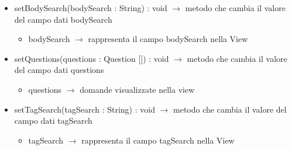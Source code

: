 \begin{description}
\begin{itemize}
	\item setBodySearch(bodySearch : String) : void $\rightarrow$ metodo che cambia il valore del campo dati bodySearch\begin{itemize}
		\item bodySearch $\rightarrow$ rappresenta il campo bodySearch nella View
	\end{itemize}
	
	\item setQuestions(questions : Question []) : void $\rightarrow$ metodo che cambia il valore del campo dati questions\begin{itemize}
		\item questions $\rightarrow$ domande visualizzate nella view
	\end{itemize}
	
	\item setTagSearch(tagSearch : String) : void $\rightarrow$ metodo che cambia il valore del campo dati tagSearch\begin{itemize}
		\item tagSearch $\rightarrow$ rappresenta il campo tagSearch nella View
	\end{itemize}
	
\end{itemize}

\end{description}

